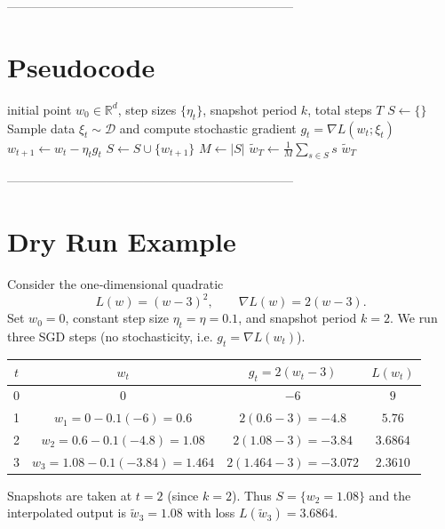 \documentclass{article}
\newcommand{\R}{\mathbb{R}}
\begin{document}
---------------------------------------------------------------------

\section*{Pseudocode}
\begin{algorithm}[H]
\caption{Stochastic Weight Interpolation (SWI)}
\begin{algorithmic}[1]
\REQUIRE initial point $w_0\in\R^d$, step sizes $\{\eta_t\}$, snapshot period $k$, total steps $T$
\STATE $S\leftarrow\{\}$ 
    \STATE Sample data $\xi_t\sim\mathcal{D}$ and compute stochastic gradient $g_t=\nabla L(w_t;\xi_t)$
    \STATE $w_{t+1}\gets w_t-\eta_t g_t$ 
        \STATE $S\leftarrow S\cup\{w_{t+1}\}$ 
    \ENDIF
\ENDFOR
\STATE $M\gets |S|$
\STATE $\widetilde w_T\gets \frac1M\sum_{s\in S}s$ 
\RETURN $\widetilde w_T$
\end{algorithmic}
\end{algorithm}

---------------------------------------------------------------------

\section*{Dry Run Example}
Consider the one‑dimensional quadratic
\[
L(w)=(w-3)^2,\qquad \nabla L(w)=2(w-3).
\]
Set $w_0=0$, constant step size $\eta_t=\eta=0.1$, and snapshot period $k=2$.  
We run three SGD steps (no stochasticity, i.e. $g_t=\nabla L(w_t)$).

\begin{center}
\begin{tabular}{c|c|c|c}
$t$ & $w_t$ & $g_t=2(w_t-3)$ & $L(w_t)$\\ \hline
0 & $0$ & $-6$ & $9$\\
1 & $w_1=0-0.1(-6)=0.6$ & $2(0.6-3)=-4.8$ & $5.76$\\
2 & $w_2=0.6-0.1(-4.8)=1.08$ & $2(1.08-3)=-3.84$ & $3.6864$\\
3 & $w_3=1.08-0.1(-3.84)=1.464$ & $2(1.464-3)=-3.072$ & $2.3610$\\
\end{tabular}
\end{center}

Snapshots are taken at $t=2$ (since $k=2$).  
Thus $S=\{w_2=1.08\}$ and the interpolated output is $\widetilde w_3 =1.08$ with loss $L(\widetilde w_3)=3.6864$.
\end{document}
